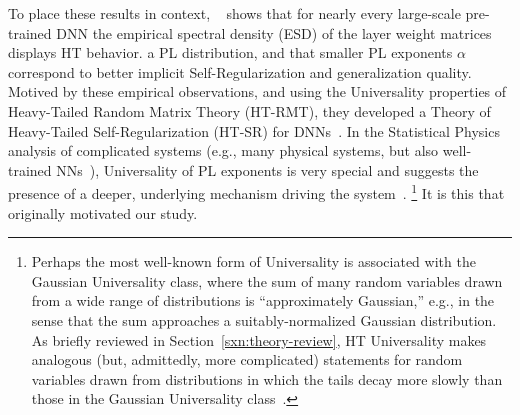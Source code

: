 To place these results in context, ~\cite{MM18_TR}
 shows that for nearly every large-scale pre-trained DNN
the empirical spectral density (ESD) of the layer weight matrices displays HT behavior.
   a PL distribution, and that smaller PL exponents $\alpha$ correspond to better implicit Self-Regularization and generalization quality.
Motived by these empirical observations, and using the Universality properties of Heavy-Tailed Random Matrix Theory (HT-RMT), they developed a Theory of Heavy-Tailed Self-Regularization (HT-SR) for DNNs~\cite{MM17_TR,MM18_TR}.
In the Statistical Physics analysis of complicated systems (e.g., many physical systems, but also well-trained NNs~\cite{EB01_BOOK,nishimori01}), Universality of PL exponents is very special and suggests the presence of a deeper, underlying mechanism driving the system~\cite{SornetteBook,BouchaudPotters03}.%
\footnote{Perhaps the most well-known form of Universality is associated with the Gaussian Universality class, where the sum of many random variables drawn from a wide range of distributions is ``approximately Gaussian,'' e.g., in the sense that the sum approaches a suitably-normalized Gaussian distribution.  As briefly reviewed in Section~\ref{sxn:theory-review}, HT Universality makes analogous (but, admittedly, more complicated) statements for random variables drawn from distributions in which the tails decay more slowly than those in the Gaussian Universality class~\cite{MM18_TR}.}
It is this  that originally motivated our study.

